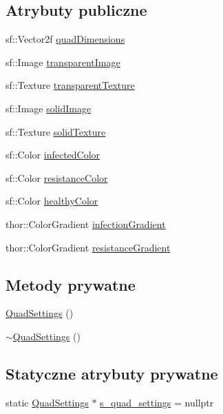 \subsection*{Atrybuty publiczne}
\begin{DoxyCompactItemize}
\item 
sf\+::\+Vector2f \mbox{\hyperlink{class_quad_settings_abb4a967873d7a93098ef168b894280d6}{quad\+Dimensions}}
\item 
sf\+::\+Image \mbox{\hyperlink{class_quad_settings_a0278924ea9c2eabc3fee5b1407cd36e8}{transparent\+Image}}
\item 
sf\+::\+Texture \mbox{\hyperlink{class_quad_settings_a5b25effa96e1e0c522377ea31f0ec1b0}{transparent\+Texture}}
\item 
sf\+::\+Image \mbox{\hyperlink{class_quad_settings_ae9f7a44f5a5f20cb0f388bfac92bf776}{solid\+Image}}
\item 
sf\+::\+Texture \mbox{\hyperlink{class_quad_settings_a8d11211eb4f03a6eb386e246818de660}{solid\+Texture}}
\item 
sf\+::\+Color \mbox{\hyperlink{class_quad_settings_a52c89695cb1f151b8007e9170dd18bbf}{infected\+Color}}
\item 
sf\+::\+Color \mbox{\hyperlink{class_quad_settings_a9d813ff930e92de96045aa982b99b177}{resistance\+Color}}
\item 
sf\+::\+Color \mbox{\hyperlink{class_quad_settings_ad170bfeb3a4bc5157107cc07eba36067}{healthy\+Color}}
\item 
thor\+::\+Color\+Gradient \mbox{\hyperlink{class_quad_settings_a82277fca891d4180f4a5df5881943cc4}{infection\+Gradient}}
\item 
thor\+::\+Color\+Gradient \mbox{\hyperlink{class_quad_settings_ac6dde1c3756bc222b42b68d8cb1beba0}{resistance\+Gradient}}
\end{DoxyCompactItemize}
\subsection*{Metody prywatne}
\begin{DoxyCompactItemize}
\item 
\mbox{\hyperlink{class_quad_settings_a2c541d4338024c495bef33ff8b990a59}{Quad\+Settings}} ()
\item 
\mbox{\hyperlink{class_quad_settings_a772e3e7e95356180f9f8c6294257dc6a}{$\sim$\+Quad\+Settings}} ()
\end{DoxyCompactItemize}
\subsection*{Statyczne atrybuty prywatne}
\begin{DoxyCompactItemize}
\item 
static \mbox{\hyperlink{class_quad_settings}{Quad\+Settings}} $\ast$ \mbox{\hyperlink{class_quad_settings_a5d46fe34f768222c9af872e0f52995a6}{s\+\_\+quad\+\_\+settings}} = nullptr
\end{DoxyCompactItemize}


